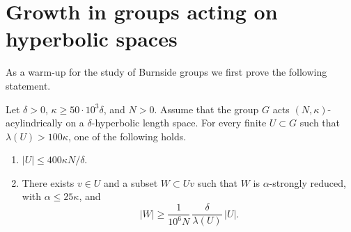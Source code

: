 \section{Growth in groups acting on hyperbolic spaces}\label{S: basepoint}

As a warm-up for the study of Burnside groups we first prove the following statement.

\begin{thm}\label{T: main acylindrical}
Let $\delta >0$, $\kappa\geqslant 50\cdot 10^3\delta$, and $N>0$.
Assume that the group $G$ acts $(N,\kappa)$-acylindrically on a $\delta$-hyperbolic length space.
For every finite $U\subset G$ such that $\lambda(U)> 100\kappa$, one of the following holds.
\begin{enumerate}
\item $\displaystyle |U| \leq 400\kappa N/\delta$.
\item There exists $v \in U$ and a subset $W \subset Uv$ such that $W$ is $\alpha$-strongly reduced, with $\alpha \leq 25\kappa$, and
\begin{equation*}
|W| \geq \frac 1{10^6N}\,\frac \delta{\lambda(U)}\, |U|.
\end{equation*}
\end{enumerate}

\end{thm}

